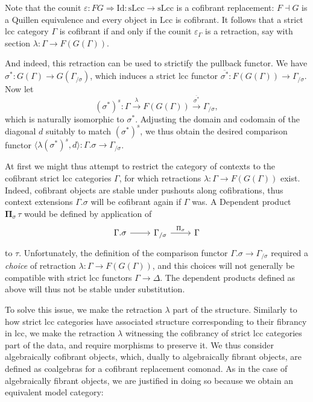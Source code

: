 \documentclass[a4paper]{article}
\theoremstyle{remark}
\theoremstyle{definition}
\begin{document}
Note that the counit $\varepsilon : FG \Rightarrow \mathrm{Id} : \mathrm{sLcc} \rightarrow \mathrm{sLcc}$ is a cofibrant replacement: $F \dashv G$ is a Quillen equivalence and every object in $\mathrm{Lcc}$ is cofibrant.
It follows that a strict lcc category $\Gamma$ is cofibrant if and only if the counit $\varepsilon_\Gamma$ is a retraction, say with section $\lambda : \Gamma \rightarrow F(G(\Gamma))$.

And indeed, this retraction can be used to strictify the pullback functor.
We have $\sigma^* : G(\Gamma) \rightarrow G(\Gamma_{/ \sigma})$, which induces a strict lcc functor $\overline{\sigma^*} : F(G(\Gamma)) \rightarrow \Gamma_{/ \sigma}$.
Now let
\begin{equation}
  (\sigma^*)^s : \Gamma \xrightarrow{\lambda} F(G(\Gamma)) \xrightarrow{\overline{\sigma^*}} \Gamma_{/ \sigma},
\end{equation}
which is naturally isomorphic to $\sigma^*$.
Adjusting the domain and codomain of the diagonal $d$ suitably to match $(\sigma^*)^s$, we thus obtain the desired comparison functor $\langle \lambda (\sigma^*)^s, d \rangle : \Gamma.\sigma \rightarrow \Gamma_{/ \sigma}$.

At first we might thus attempt to restrict the category of contexts to the cofibrant strict lcc categories $\Gamma$, for which retractions $\lambda : \Gamma \rightarrow F(G(\Gamma))$ exist.
Indeed, cofibrant objects are stable under pushouts along cofibrations, thus context extensions $\Gamma.\sigma$ will be cofibrant again if $\Gamma$ was.
A Dependent product $\mathbf{\Pi}_\sigma \, \tau$ would be defined by application of
\begin{equation}
  \begin{tikzcd}
    \Gamma.\sigma \arrow[r] & \Gamma_{/ \sigma} \arrow[r, "\Pi_\sigma"] & \Gamma
  \end{tikzcd}
\end{equation}
to $\tau$.
Unfortunately, the definition of the comparison functor $\Gamma.\sigma \rightarrow \Gamma_{/ \sigma}$ required a \emph{choice} of retraction $\lambda : \Gamma \rightarrow F(G(\Gamma))$, and this choices will not generally be compatible with strict lcc functors $\Gamma \rightarrow \Delta$.
The dependent products defined as above will thus not be stable under substitution.

To solve this issue, we make the retraction $\lambda$ part of the structure.
Similarly to how strict lcc categories have associated structure corresponding to their fibrancy in lcc, we make the retraction $\lambda$ witnessing the cofibrancy of strict lcc categories part of the data, and require morphisms to preserve it.
We thus consider algebraically cofibrant objects, which, dually to algebraically fibrant objects, are defined as coalgebras for a cofibrant replacement comonad.
As in the case of algebraically fibrant objects, we are justified in doing so because we obtain an equivalent model category:
\end{document}
